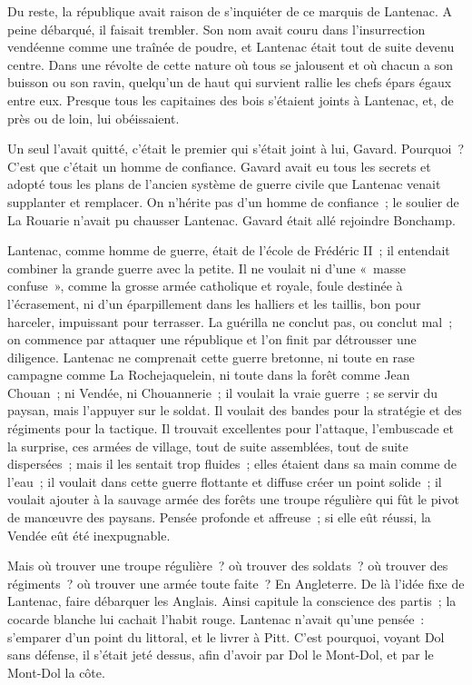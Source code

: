 \documentclass[french,twoside]{book} %
\begin{document}
Du reste, la république avait raison de s’inquiéter de ce marquis de Lantenac. A peine débarqué, il faisait trembler. Son nom avait couru dans l’insurrection vendéenne comme une traînée de poudre, et Lantenac était tout de suite devenu centre. Dans une révolte de cette nature où tous se jalousent et où chacun a son buisson ou son ravin, quelqu’un de haut qui survient rallie les chefs épars égaux entre eux. Presque tous les capitaines des bois s’étaient joints à Lantenac, et, de près ou de loin, lui obéissaient.\par
Un seul l’avait quitté, c’était le premier qui s’était  joint à lui, Gavard. Pourquoi ? C’est que c’était un homme de confiance. Gavard avait eu tous les secrets et adopté tous les plans de l’ancien système de guerre civile que Lantenac venait supplanter et remplacer. On n’hérite pas d’un homme de confiance ; le soulier de La Rouarie n’avait pu chausser Lantenac. Gavard était allé rejoindre Bonchamp.\par
Lantenac, comme homme de guerre, était de l’école de Frédéric II ; il entendait combiner la grande guerre avec la petite. Il ne voulait ni d’une « masse confuse », comme la grosse armée catholique et royale, foule destinée à l’écrasement, ni d’un éparpillement dans les halliers et les taillis, bon pour harceler, impuissant pour terrasser. La guérilla ne conclut pas, ou conclut mal ; on commence par attaquer une république et l’on finit par détrousser une diligence. Lantenac ne comprenait cette guerre bretonne, ni toute en rase campagne comme La Rochejaquelein, ni toute dans la forêt comme Jean Chouan ; ni Vendée, ni Chouannerie ; il voulait la vraie guerre ; se servir du paysan, mais l’appuyer sur le soldat. Il voulait des bandes pour la stratégie et des régiments pour la tactique. Il trouvait excellentes pour l’attaque, l’embuscade et la surprise, ces armées de village, tout de suite assemblées, tout de suite dispersées ; mais il les sentait trop fluides ; elles étaient dans sa main comme de l’eau ; il voulait dans cette guerre flottante et diffuse créer un point solide ; il voulait ajouter à la sauvage armée des forêts une troupe régulière qui fût le pivot de manœuvre des paysans. Pensée profonde  et affreuse ; si elle eût réussi, la Vendée eût été inexpugnable.\par
Mais où trouver une troupe régulière ? où trouver des soldats ? où trouver des régiments ? où trouver une armée toute faite ? En Angleterre. De là l’idée fixe de Lantenac, faire débarquer les Anglais. Ainsi capitule la conscience des partis ; la cocarde blanche lui cachait l’habit rouge. Lantenac n’avait qu’une pensée : s’emparer d’un point du littoral, et le livrer à Pitt. C’est pourquoi, voyant Dol sans défense, il s’était jeté dessus, afin d’avoir par Dol le Mont-Dol, et par le Mont-Dol la côte.\par
\end{document}
